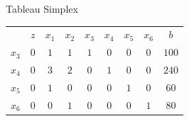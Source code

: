 \begin{frame}
{\begin{block}{Tableau Simplex}
 			\begin{table}
 				\begin{tabular}{c c c c c c c c c}
					& \cellcolor{blue!80} \color{white} $ \scriptstyle z$
					& \cellcolor{blue!80} \color{white} $ \scriptstyle x_1$ 
					& \cellcolor{blue!80} \color{white} $ \scriptstyle x_2$
					& \cellcolor{blue!80} \color{red} $ \scriptstyle x_3$
					& \cellcolor{blue!80} \color{red} $ \scriptstyle x_4$
					& \cellcolor{blue!80} \color{red} $ \scriptstyle x_5$
					& \cellcolor{blue!80} \color{red} $ \scriptstyle x_6$ 
					& \cellcolor{blue!80} \color{white} $ \scriptstyle b$ \\
					\cellcolor{blue!80} \color{red} $ \scriptstyle x_3$
					& \cellcolor{yellow!60}  $ \scriptstyle 0$
					& \cellcolor{yellow!60}  $ \scriptstyle 1$ 
					& \cellcolor{yellow!60}  $ \scriptstyle 1$
					& \cellcolor{yellow!60}  $ \scriptstyle 1$
					& \cellcolor{yellow!60}  $ \scriptstyle 0$
					& \cellcolor{yellow!60}  $ \scriptstyle 0$
					& \cellcolor{yellow!60}  $ \scriptstyle 0$ 
					& \cellcolor{yellow!60}  $ \scriptstyle 100$ \\ 
					\cellcolor{blue!80} \color{red} $ \scriptstyle x_4$
					& \cellcolor{yellow!60}  $ \scriptstyle 0$
					& \cellcolor{yellow!60}  $ \scriptstyle 3$ 
					& \cellcolor{yellow!60}  $ \scriptstyle 2$
					& \cellcolor{yellow!60}  $ \scriptstyle 0$
					& \cellcolor{yellow!60}  $ \scriptstyle 1$
					& \cellcolor{yellow!60}  $ \scriptstyle 0$
					& \cellcolor{yellow!60}  $ \scriptstyle 0$ 
					& \cellcolor{yellow!60}  $ \scriptstyle 240$ \\ 
					\cellcolor{blue!80} \color{red} $ \scriptstyle x_5$  
					& \cellcolor{yellow!60}  $ \scriptstyle 0$
					& \cellcolor{yellow!60}  $ \scriptstyle 1$ 
					& \cellcolor{yellow!60}  $ \scriptstyle 0$
					& \cellcolor{yellow!60}  $ \scriptstyle 0$
					& \cellcolor{yellow!60}  $ \scriptstyle 0$
					& \cellcolor{yellow!60}  $ \scriptstyle 1$
					& \cellcolor{yellow!60}  $ \scriptstyle 0$ 
					& \cellcolor{yellow!60}  $ \scriptstyle 60$ \\
					\cellcolor{blue!80} \color{red} $ \scriptstyle x_6$
					& \cellcolor{yellow!60}  $ \scriptstyle 0$
					& \cellcolor{yellow!60}  $ \scriptstyle 0$ 
					& \cellcolor{yellow!60}  $ \scriptstyle 1$
					& \cellcolor{yellow!60}  $ \scriptstyle 0$
					& \cellcolor{yellow!60}  $ \scriptstyle 0$
					& \cellcolor{yellow!60}  $ \scriptstyle 0$
					& \cellcolor{yellow!60}  $ \scriptstyle 1$ 
					& \cellcolor{yellow!60}  $ \scriptstyle 80$ \\

\end{tabular}
\end{table}
\end{block}}
\end{frame}
